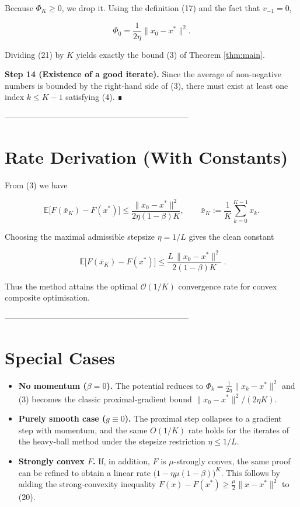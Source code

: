 \documentclass{article}
\begin{document}
Because \(\Phi_{K}\ge0\), we drop it. Using the definition (17) and the fact that
\(v_{-1}=0\),

\[
\Phi_{0}= \frac{1}{2\eta}\|x_{0}-x^{*}\|^{2}. \tag{22}
\]

Dividing (21) by \(K\) yields exactly the bound (3) of Theorem \ref{thm:main}.

\medskip
\noindent\textbf{Step 14 (Existence of a good iterate).}  
Since the average of non‑negative numbers is bounded by the right‑hand side of (3),
there must exist at least one index \(k\le K-1\) satisfying (4). ∎

--------------------------------------------------------------------

\section*{Rate Derivation (With Constants)}
From (3) we have  

\[
\mathbb{E}\bigl[F(\bar{x}_{K})-F(x^{*})\bigr]
\le\frac{\|x_{0}-x^{*}\|^{2}}{2\eta(1-\beta)K},
\qquad 
\bar{x}_{K}:=\frac{1}{K}\sum_{k=0}^{K-1}x_{k}.
\]

Choosing the maximal admissible stepsize \(\eta=1/L\) gives the clean constant  

\[
\boxed{\;
\mathbb{E}\bigl[F(\bar{x}_{K})-F(x^{*})\bigr]
\le\frac{L\,\|x_{0}-x^{*}\|^{2}}{2(1-\beta)K}\; }.
\]

Thus the method attains the optimal \(\mathcal{O}(1/K)\) convergence rate for convex
composite optimisation.

--------------------------------------------------------------------

\section*{Special Cases}
\begin{itemize}
\item \textbf{No momentum (\(\beta=0\)).}  
The potential reduces to \(\Phi_{k}= \frac{1}{2\eta}\|x_{k}-x^{*}\|^{2}\) and (3) becomes the classic
proximal‑gradient bound \(\|x_{0}-x^{*}\|^{2}/(2\eta K)\).

\item \textbf{Purely smooth case (\(g\equiv0\)).}  
The proximal step collapses to a gradient step with momentum, and the same
\(O(1/K)\) rate holds for the iterates of the heavy‑ball method under the stepsize restriction \(\eta\le1/L\).

\item \textbf{Strongly convex \(F\).}  
If, in addition, \(F\) is \(\mu\)-strongly convex, the same proof can be refined to obtain a linear rate
\( \bigl(1-\eta\mu(1-\beta)\bigr)^{K}\). This follows by adding the strong‑convexity inequality
\(F(x)-F(x^{*})\ge\frac{\mu}{2}\|x-x^{*}\|^{2}\) to (20).
\end{itemize}
\end{document}
